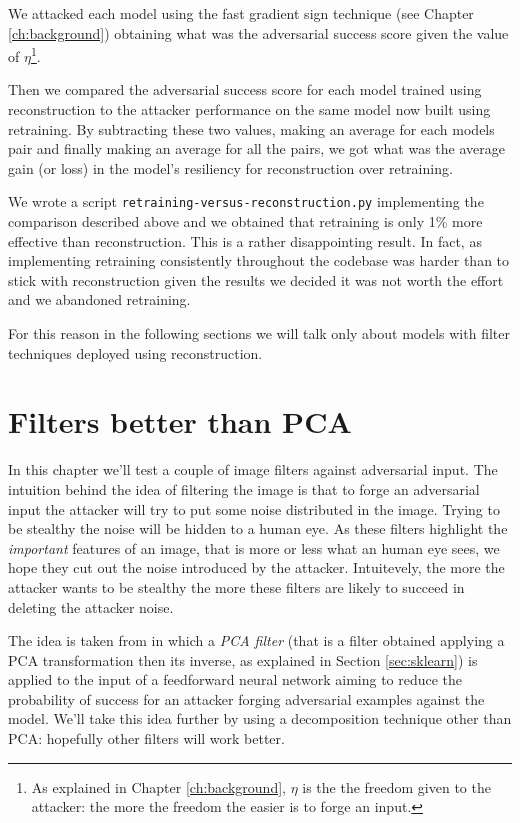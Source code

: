 We attacked each model using the fast gradient sign technique (see
Chapter \ref{ch:background}) obtaining what was the adversarial success
score given the value of $\eta$\footnote{As explained in Chapter
  \ref{ch:background}, $\eta$ is the the freedom given to the attacker:
  the more the freedom the easier is to forge an input.}.

Then we compared the adversarial success score for each model trained
using reconstruction to the attacker performance on the same model now
built using retraining. By subtracting these two values, making an
average for each models pair and finally making an average for all the
pairs, we got what was the average gain (or loss) in the model's
resiliency for reconstruction over retraining.

We wrote a script \texttt{retraining-versus-reconstruction.py}
implementing the comparison described above and we obtained that
retraining is only 1\% more effective than reconstruction. This is a
rather disappointing result. In fact, as implementing retraining
consistently throughout the codebase was harder than to stick with
reconstruction given the results we decided it was not worth the effort
and we abandoned retraining.

For this reason in the following sections we will talk only about models
with filter techniques deployed using reconstruction.

\section{Filters better than PCA}

In this chapter we'll test a couple of image filters against
adversarial input. The intuition behind the idea of filtering the image
is that to forge an adversarial input the attacker will try to put some
noise distributed in the image. Trying to be stealthy the noise will be
hidden to a human eye. As these filters highlight the \emph{important}
features of an image, that is more or less what an human eye sees, we
hope they cut out the noise introduced by the attacker. Intuitevely,
the more the attacker wants to be stealthy the more these filters are
likely to succeed in deleting the attacker noise.

The idea is taken from \cite{bhagoji2018enhancing} in which a \emph{PCA
  filter} (that is a filter obtained applying a PCA transformation then
its inverse, as explained in Section \ref{sec:sklearn}) is applied to
the input of a feedforward neural network aiming to reduce the
probability of success for an attacker forging adversarial examples
against the model. We'll take this idea further by using a
decomposition technique other than PCA: hopefully other filters will
work better.

